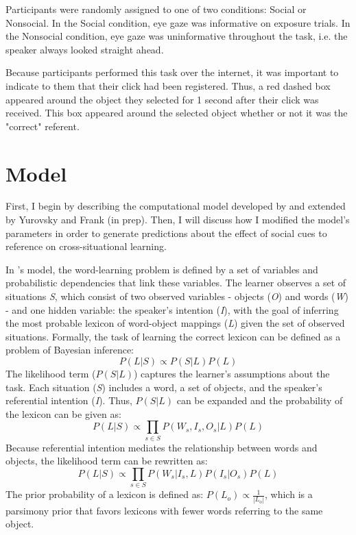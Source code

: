 \documentclass[man]{apa2}
\begin{document}
Participants were randomly assigned to one of two conditions: Social or Nonsocial. In the Social condition, eye gaze was informative on exposure trials. In the Nonsocial condition, eye gaze was uninformative throughout the task, i.e. the speaker always looked straight ahead. 

Because participants performed this task over the internet, it was important to
indicate to them that their click had been registered. Thus, a red dashed box appeared
around the object they selected for 1 second after their click was received. This box
appeared around the selected object whether or not it was the "correct" referent.









\section{Model}

First, I begin by describing the computational model developed by  and extended by Yurovsky and Frank (in prep). Then, I will discuss how I modified the model's parameters in order to generate predictions about the effect of social cues to reference on cross-situational learning. 

In \citeauthor{frank2009using}'s model, the word-learning problem is defined by a set of variables and probabilistic dependencies that link these variables. The learner observes a set of situations \emph{S}, which consist of two observed variables - objects (\emph{O}) and words (\emph{W}) - and one hidden variable: the speaker's intention (\emph{I}), with the goal of inferring the most probable lexicon of word-object mappings (\emph{L}) given the set of observed situations. Formally, the task of learning the correct lexicon can be defined as a problem of Bayesian inference: 
%
\begin{equation}
\label{1}
P(L|S) \propto P(S|L)P(L)
\end{equation}
%
The likelihood term ($P(S|L)$) captures the learner's assumptions about the task. Each situation (\emph{S}) includes a word, a set of objects, and the speaker's referential intention (\emph{I}). Thus, $P(S|L)$ can be expanded and the probability of the lexicon can be given as: 
%
\begin{equation}
\label{2}
P(L|S) \propto \prod\limits_{s \in S}  P(W_s, I_s, O_s|L)P(L)
\end{equation}
%
Because referential intention mediates the relationship between words and objects, the likelihood term can be rewritten as:
%
\begin{equation}
\label{3}
P(L|S) \propto \prod\limits_{s \in S}  P(W_s|I_s, L)P(I_s|O_s)P(L)
\end{equation}
%
The prior probability of a lexicon is defined as: $P(L_o) \propto \frac{1}{|L_o|}$, which is a parsimony prior that favors lexicons with fewer words referring to the same object. 
\end{document}
